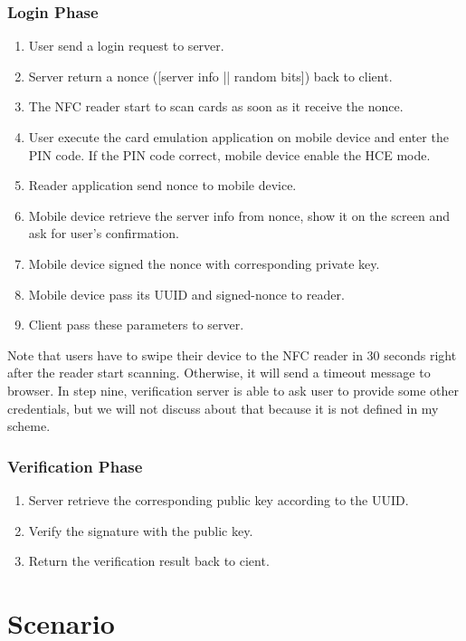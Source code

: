 \begin{CJK}{Bg5}{bsmi}
\subsubsection{Login Phase}

\begin{enumerate}
\item User send a login request to server.
\item Server return a nonce ([server info || random bits]) back to client.
\item The NFC reader start to scan cards as soon as it receive the nonce.
\item User execute the card emulation application on mobile device and enter the PIN code. If the PIN code correct, mobile device enable the HCE mode.
\item Reader application send nonce to mobile device.
\item Mobile device retrieve the server info from nonce, show it on the screen and ask for user's confirmation.
\item Mobile device signed the nonce with corresponding private key.
\item Mobile device pass its UUID and signed-nonce to reader.
\item Client pass these parameters to server.
\end{enumerate}

Note that users have to swipe their device to the NFC reader in 30 seconds right after the reader start scanning. Otherwise, it will send a timeout message to browser. In step nine, verification server is able to ask user to provide some other credentials, but we will not discuss about that because it is not defined in my scheme.

\subsubsection{Verification Phase}

\begin{enumerate}
\item Server retrieve the corresponding public key according to the UUID.
\item Verify the signature with the public key.
\item Return the verification result back to cient.
\end{enumerate}

\section{Scenario}


\end{CJK}
